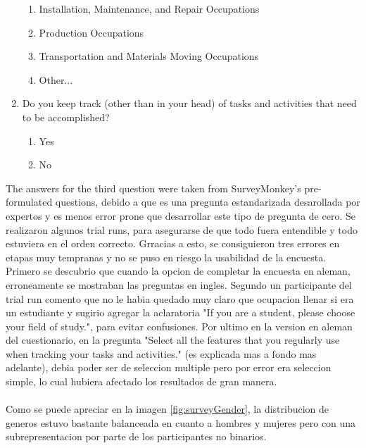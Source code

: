 \begin{enumerate}
\begin{enumerate}
            \item Installation, Maintenance, and Repair Occupations
            \item Production Occupations
            \item Transportation and Materials Moving Occupations
            \item Other...
        \end{enumerate}
    \item Do you keep track (other than in your head) of tasks and activities that need to be accomplished?
        \begin{enumerate}
            \item Yes
            \item No
        \end{enumerate}
\end{enumerate}

The answers for the third question were taken from SurveyMonkey's pre-formulated questions, debido a que es una pregunta estandarizada desarollada por expertos y es menos error prone que desarrollar este tipo de pregunta de cero. Se realizaron algunos trial runs, para asegurarse de que todo fuera entendible y todo estuviera en el orden correcto. Grracias a esto, se consiguieron tres errores en etapas muy tempranas y no se puso en riesgo la usabilidad de la encuesta. Primero se descubrio que cuando la opcion de completar la encuesta en aleman, erroneamente se mostraban las preguntas en ingles. Segundo un participante del trial run comento que no le habia quedado muy claro que ocupacion llenar si era un estudiante y sugirio agregar la aclaratoria "If you are a student, please choose your field of study.", para evitar confusiones. Por ultimo en la version en aleman del cuestionario, en la pregunta "Select all the features that you regularly use when tracking your tasks and activities." (es explicada mas a fondo mas adelante), debia poder ser de seleccion multiple pero por error era seleccion simple, lo cual hubiera afectado los resultados de gran manera.\\
\\
Como se puede apreciar en la imagen \ref{fig:surveyGender}, la distribucion de generos estuvo bastante balanceada en cuanto a hombres y mujeres pero con una subrepresentacion por parte de los participantes no binarios.

